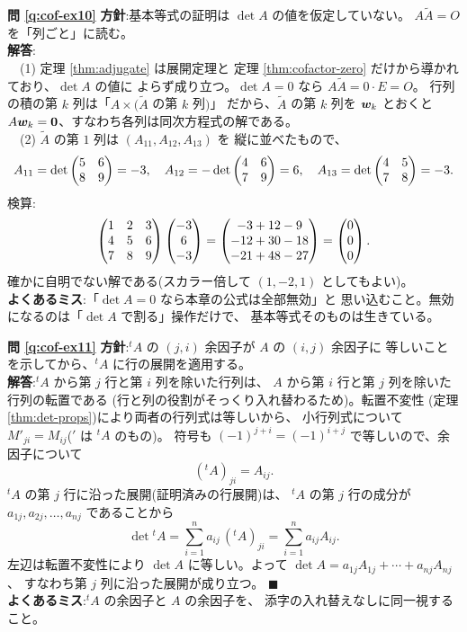 \bigskip
\noindent\textbf{問 \ref{q:cof-ex10}}\quad
\textbf{方針}:基本等式の証明は $\det A$ の値を仮定していない。
$A\widetilde{A} = O$ を「列ごと」に読む。\\
\textbf{解答}:\\
　(1) 定理 \ref{thm:adjugate} は展開定理と
定理 \ref{thm:cofactor-zero} だけから導かれており、$\det A$ の値に
よらず成り立つ。$\det A = 0$ なら $A\widetilde{A} = 0 \cdot E = O$。
行列の積の第 $k$ 列は「$A \times (\widetilde{A}$ の第 $k$ 列$)$」
だから、$\widetilde{A}$ の第 $k$ 列を $\bm{w}_k$ とおくと
$A\bm{w}_k = \bm{0}$、すなわち各列は同次方程式の解である。\\
　(2) $\widetilde{A}$ の第 $1$ 列は $(A_{11}, A_{12}, A_{13})$ を
縦に並べたもので、
\[
A_{11} = \det \begin{pmatrix}5 & 6 \\ 8 & 9\end{pmatrix} = -3, \quad
A_{12} = -\det \begin{pmatrix}4 & 6 \\ 7 & 9\end{pmatrix} = 6, \quad
A_{13} = \det \begin{pmatrix}4 & 5 \\ 7 & 8\end{pmatrix} = -3.
\]
検算:
\[
\begin{pmatrix}1 & 2 & 3 \\ 4 & 5 & 6 \\ 7 & 8 & 9\end{pmatrix} \begin{pmatrix}-3 \\ 6 \\ -3\end{pmatrix}
= \begin{pmatrix}-3 + 12 - 9 \\ -12 + 30 - 18 \\ -21 + 48 - 27\end{pmatrix} = \begin{pmatrix}0 \\ 0 \\ 0\end{pmatrix}.
\]
確かに自明でない解である(スカラー倍して $(1, -2, 1)$ としてもよい)。\\
\textbf{よくあるミス}:「$\det A = 0$ なら本章の公式は全部無効」と
思い込むこと。無効になるのは「$\det A$ で割る」操作だけで、
基本等式そのものは生きている。

\bigskip
\noindent\textbf{問 \ref{q:cof-ex11}}\quad
\textbf{方針}:${}^t\!A$ の $(j, i)$ 余因子が $A$ の $(i, j)$ 余因子に
等しいことを示してから、${}^t\!A$ に行の展開を適用する。\\
\textbf{解答}:${}^t\!A$ から第 $j$ 行と第 $i$ 列を除いた行列は、
$A$ から第 $i$ 行と第 $j$ 列を除いた行列の転置である
(行と列の役割がそっくり入れ替わるため)。転置不変性
(定理 \ref{thm:det-props})により両者の行列式は等しいから、
小行列式について $M'_{ji} = M_{ij}$(${}'$ は ${}^t\!A$ のもの)。
符号も $(-1)^{j+i} = (-1)^{i+j}$ で等しいので、余因子について
\[
({}^t\!A)_{ji} = A_{ij}.
\]
${}^t\!A$ の第 $j$ 行に沿った展開(証明済みの行展開)は、
${}^t\!A$ の第 $j$ 行の成分が $a_{1j}, a_{2j}, \dots, a_{nj}$ であることから
\[
\det {}^t\!A = \sum_{i=1}^{n} a_{ij} \, ({}^t\!A)_{ji}
= \sum_{i=1}^{n} a_{ij} A_{ij}.
\]
左辺は転置不変性により $\det A$ に等しい。よって
$\det A = a_{1j}A_{1j} + \cdots + a_{nj}A_{nj}$、
すなわち第 $j$ 列に沿った展開が成り立つ。 $\blacksquare$\\
\textbf{よくあるミス}:${}^t\!A$ の余因子と $A$ の余因子を、
添字の入れ替えなしに同一視すること。

